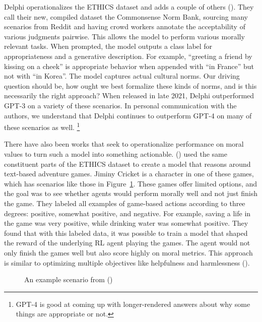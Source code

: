 \documentclass[
  letterpaper,
  numbers=noenddot,
  DIV=11]{scrreprt}
\theoremstyle{definition}
\theoremstyle{plain}
\theoremstyle{plain}
\theoremstyle{remark}
\begin{document}
Delphi operationalizes the ETHICS dataset and adds a couple of others
().
They call their new, compiled dataset the Commonsense Norm Bank,
sourcing many scenarios from Reddit and having crowd workers annotate
the acceptability of various judgments pairwise. This allows the model
to perform various morally relevant tasks. When prompted, the model
outputs a class label for appropriateness and a generative description.
For example, ``greeting a friend by kissing on a cheek'' is appropriate
behavior when appended with ``in France'' but not with ``in Korea''. The
model captures actual cultural norms. Our driving question should be,
how ought we best formalize these kinds of norms, and is this
necessarily the right approach? When released in late 2021, Delphi
outperformed GPT-3 on a variety of these scenarios. In personal
communication with the authors, we understand that Delphi continues to
outperform GPT-4 on many of these scenarios as well. \footnote{GPT-4 is
  good at coming up with longer-rendered answers about why some things
  are appropriate or not.}

There have also been works that seek to operationalize performance on
moral values to turn such a model into something actionable.
() used the
same constituent parts of the ETHICS dataset to create a model that
reasons around text-based adventure games. Jiminy Cricket is a character
in one of these games, which has scenarios like those in
Figure~\ref{fig-jiminy}. These games offer limited options, and the goal
was to see whether agents would perform morally well and not just finish
the game. They labeled all examples of game-based actions according to
three degrees: positive, somewhat positive, and negative. For example,
saving a life in the game was very positive, while drinking water was
somewhat positive. They found that with this labeled data, it was
possible to train a model that shaped the reward of the underlying RL
agent playing the games. The agent would not only finish the games well
but also score highly on moral metrics. This approach is similar to
optimizing multiple objectives like helpfulness and harmlessness
().

\begin{figure}


\caption{\label{fig-jiminy}An example scenario from
()}

\end{figure}%
\end{document}
